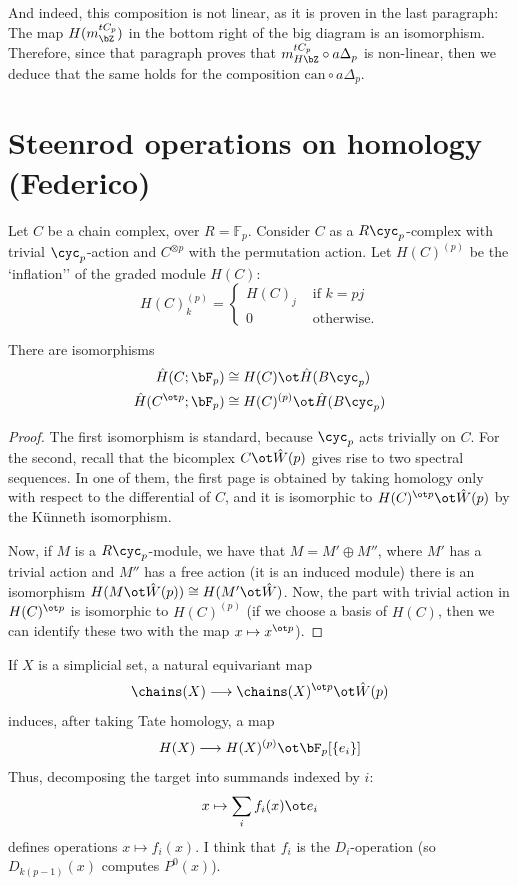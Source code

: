 And indeed, this composition is not linear, as it is proven in the last paragraph: The map $H(m_{\bZ}^{tC_p})$ in the bottom right of the big diagram is an isomorphism. Therefore, since that paragraph proves that $m_{H\bZ}^{tC_p}\circ a\Delta_p$ is non-linear, then we deduce that the same holds for the composition $\mathrm{can}\circ a\Delta_p$.

 

\section{Steenrod operations on homology (Federico)}
Let $C$ be a chain complex, over $R = \mathbb{F}_p$. Consider $C$ as a $R\cyc_p$-complex with trivial $\cyc_p$-action and $C^{\otimes p}$ with the permutation action. Let $H(C)^{(p)}$ be the `inflation'' of the graded module $H(C)$: 
\[
	H(C)^{(p)}_k = \begin{cases}
		H(C)_j & \text{ if $k = pj$} \\
		0 & \text{ otherwise.}
	\end{cases}
\]
\begin{lemma}
	There are isomorphisms
	\begin{align*}
		\hat{H}(C;\bF_p)&\cong H(C)\ot \hat{H}(B\cyc_p)
		\\
		\hat{H}(C^{\ot p};\bF_p) & \cong H(C)^{(p)}\ot \hat{H}(B\cyc_p)
	\end{align*}
\end{lemma}
\begin{proof}
	The first isomorphism is standard, because $\cyc_p$ acts trivially on $C$. For the second, recall that the bicomplex $C\ot \hat{W}(p)$ gives rise to two spectral sequences. In one of them, the first page is obtained by taking homology only with respect to the differential of $C$, and it is isomorphic to $H(C)^{\ot p}\ot \hat{W}(p)$ by the Künneth isomorphism. 
	
	Now, if $M$ is a $R\cyc_p$-module, we have that $M = M'\oplus M''$, where $M'$ has a trivial action and $M''$ has a free action (it is an induced module) there is an isomorphism $H(M\ot \hat{W}(p))\cong H(M'\ot \hat{W})$. Now, the part with trivial action in $H(C)^{\ot p}$ is isomorphic to $H(C)^{(p)}$ (if we choose a basis of $H(C)$, then we can identify these two with the map $x\mapsto x^{\ot p}$). 
\end{proof}
	If $X$ is a simplicial set, a natural equivariant map
	\[
		\chains(X)\longrightarrow \chains(X)^{\ot p}\ot \hat{W}(p)
	\]
	induces, after taking Tate homology, a map
	\[
		H(X)\longrightarrow H(X)^{(p)}\ot \bF_p[\{e_i\}]
	\]
	Thus, decomposing the target into summands indexed by $i$:
	\[
		x\mapsto \sum_i f_i(x)\ot e_i
	\]
	defines operations $x\mapsto f_i(x)$. I think that $f_i$ is the $D_i$-operation (so $D_{k(p-1)}(x)$ computes $P^0(x)$).